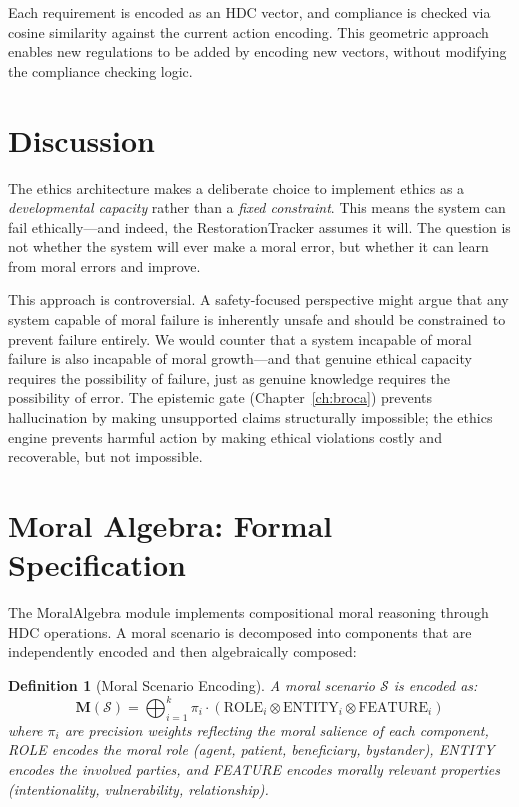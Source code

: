 \documentclass[12pt]{book}
\newtheorem{definition}[theorem]{Definition}
\newcommand{\bind}{\otimes}
\begin{document}
Each requirement is encoded as an HDC vector, and compliance is checked via cosine similarity against the current action encoding. This geometric approach enables new regulations to be added by encoding new vectors, without modifying the compliance checking logic.

\section{Discussion}

The ethics architecture makes a deliberate choice to implement ethics as a \textit{developmental capacity} rather than a \textit{fixed constraint}. This means the system can fail ethically---and indeed, the RestorationTracker assumes it will. The question is not whether the system will ever make a moral error, but whether it can learn from moral errors and improve.

This approach is controversial. A safety-focused perspective might argue that any system capable of moral failure is inherently unsafe and should be constrained to prevent failure entirely. We would counter that a system incapable of moral failure is also incapable of moral growth---and that genuine ethical capacity requires the possibility of failure, just as genuine knowledge requires the possibility of error. The epistemic gate (Chapter~\ref{ch:broca}) prevents hallucination by making unsupported claims structurally impossible; the ethics engine prevents harmful action by making ethical violations costly and recoverable, but not impossible.

\section{Moral Algebra: Formal Specification}

The MoralAlgebra module implements compositional moral reasoning through HDC operations. A moral scenario is decomposed into components that are independently encoded and then algebraically composed:

\begin{definition}[Moral Scenario Encoding]\label{def:moral-encoding}
A moral scenario $\mathcal{S}$ is encoded as:
\begin{equation}
\mathbf{M}(\mathcal{S}) = \bigoplus_{i=1}^{k} \pi_i \cdot (\text{ROLE}_i \bind \text{ENTITY}_i \bind \text{FEATURE}_i)
\end{equation}
where $\pi_i$ are precision weights reflecting the moral salience of each component, ROLE encodes the moral role (agent, patient, beneficiary, bystander), ENTITY encodes the involved parties, and FEATURE encodes morally relevant properties (intentionality, vulnerability, relationship).
\end{definition}
\end{document}
